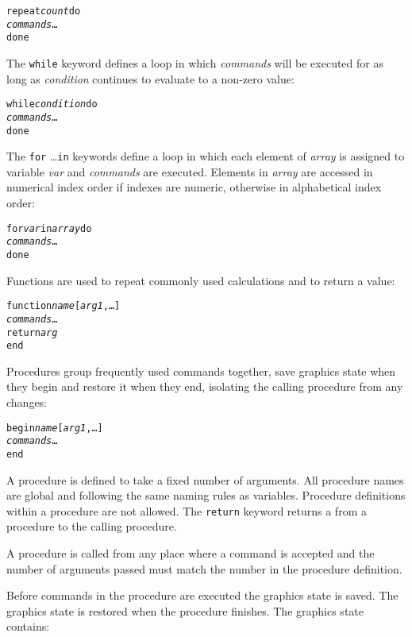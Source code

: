 \begin{alltt}
repeat \textit{count} do
  \textit{commands} \dots
done
\end{alltt}

The \texttt{while} keyword defines a loop in which
\textit{commands} will be executed for as long
as \textit{condition} continues to evaluate to a non-zero value:

\begin{alltt}
while \textit{condition} do
  \textit{commands} \dots
done
\end{alltt}

The \texttt{for} \dots \texttt{in} keywords define a loop in which
each element of \textit{array} is assigned to variable \textit{var}
and \textit{commands} are executed.
Elements in \textit{array} are accessed in numerical index order if
indexes are numeric, otherwise in alphabetical index order:

\begin{alltt}
for \textit{var} in \textit{array} do
  \textit{commands} \dots
done
\end{alltt}

Functions are used to repeat commonly used calculations and to
return a value:

\begin{alltt}
function \textit{name} [\textit{arg1}, \dots]
  \textit{commands} \dots
  \texttt{return} \textit{arg}
end
\end{alltt}

Procedures group frequently used commands together, save
graphics state when they begin and restore it when they end,
isolating the calling procedure from any changes:

\begin{alltt}
begin \textit{name} [\textit{arg1}, \dots]
  \textit{commands} \dots
end
\end{alltt}

A procedure is defined to take a fixed number of arguments.
All procedure names are global and following the same naming
rules as variables.
Procedure definitions within a procedure are not allowed.
The \texttt{return} keyword returns a
from a procedure to the calling procedure.

A procedure is called from any place where a command is accepted
and the number of arguments passed must match the number 
in the procedure definition.

Before commands in the procedure are executed
the graphics state is saved.
\label{graphicsstate}
The graphics state is restored when the procedure finishes.
The graphics state contains:

